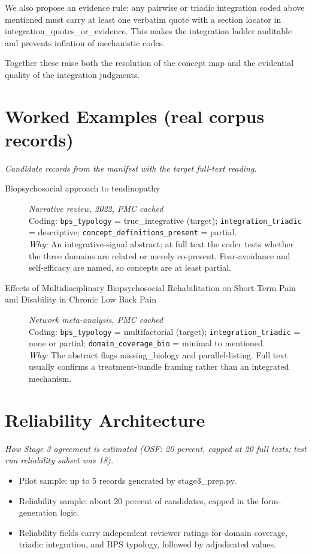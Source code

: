 \documentclass[11pt]{article}
\begin{document}
We also propose an evidence rule: any pairwise or triadic integration coded above mentioned must carry at least one verbatim quote with a section locator in integration\_quotes\_or\_evidence. This makes the integration ladder auditable and prevents inflation of mechanistic codes.

Together these raise both the resolution of the concept map and the evidential quality of the integration judgments.


\section*{Worked Examples (real corpus records)}
{\small\itshape Candidate records from the manifest with the target full-text reading.}\par\smallskip
\begin{description}
\item[Biopsychosocial approach to tendinopathy] {\small \textit{Narrative review, 2022, PMC cached}}\\
{\small Coding: \texttt{bps\_typology} = true\_integrative (target); \texttt{integration\_triadic} = descriptive; \texttt{concept\_definitions\_present} = partial.\\ \textit{Why:} An integrative-signal abstract; at full text the coder tests whether the three domains are related or merely co-present. Fear-avoidance and self-efficacy are named, so concepts are at least partial.}
\item[Effects of Multidisciplinary Biopsychosocial Rehabilitation on Short-Term Pain and Disability in Chronic Low Back Pain] {\small \textit{Network meta-analysis, PMC cached}}\\
{\small Coding: \texttt{bps\_typology} = multifactorial (target); \texttt{integration\_triadic} = none or partial; \texttt{domain\_coverage\_bio} = minimal to mentioned.\\ \textit{Why:} The abstract flags missing\_biology and parallel-listing. Full text usually confirms a treatment-bundle framing rather than an integrated mechanism.}
\end{description}

\section*{Reliability Architecture}
{\small\itshape How Stage 3 agreement is estimated (OSF: 20 percent, capped at 20 full texts; test run reliability subset was 18).}\par\smallskip
\begin{itemize}
\item Pilot sample: up to 5 records generated by stage3\_prep.py.
\item Reliability sample: about 20 percent of candidates, capped in the form-generation logic.
\item Reliability fields carry independent reviewer ratings for domain coverage, triadic integration, and BPS typology, followed by adjudicated values.
\end{itemize}
\end{document}
